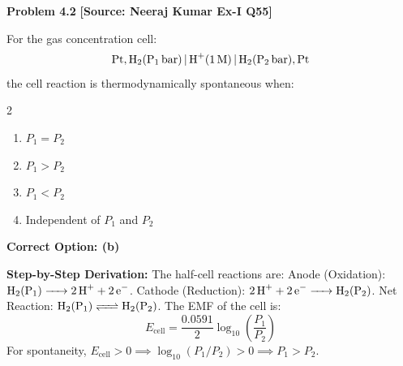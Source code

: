 \begin{problembox}
\textbf{Problem 4.2} \hfill \textbf{[Source: Neeraj Kumar Ex-I Q55]}

For the gas concentration cell:
\begin{equation*}
    \ce{Pt, H2(P_1 bar) | H+(1 M) | H2(P_2 bar), Pt}
\end{equation*}
the cell reaction is thermodynamically spontaneous when:
\begin{multicols}{2}
\begin{enumerate}[label=(\alph*)]
    \item $P_1 = P_2$
    \item $P_1 > P_2$
    \item $P_1 < P_2$
    \item Independent of $P_1$ and $P_2$
\end{enumerate}
\end{multicols}
\end{problembox}
\begin{solution}
\textbf{Correct Option: (b)}

\textbf{Step-by-Step Derivation:}
The half-cell reactions are:
Anode (Oxidation): $\ce{H2(P_1) -> 2H+ + 2e^-}$.
Cathode (Reduction): $\ce{2H+ + 2e^- -> H2(P_2)}$.
Net Reaction: $\ce{H2(P_1) <=> H2(P_2)}$.
The EMF of the cell is:
\begin{equation*}
    E_{\text{cell}} = \frac{0.0591}{2} \log_{10} \left(\frac{P_1}{P_2}\right)
\end{equation*}
For spontaneity, $E_{\text{cell}} > 0 \implies \log_{10}(P_1 / P_2) > 0 \implies P_1 > P_2$.
\end{solution}

